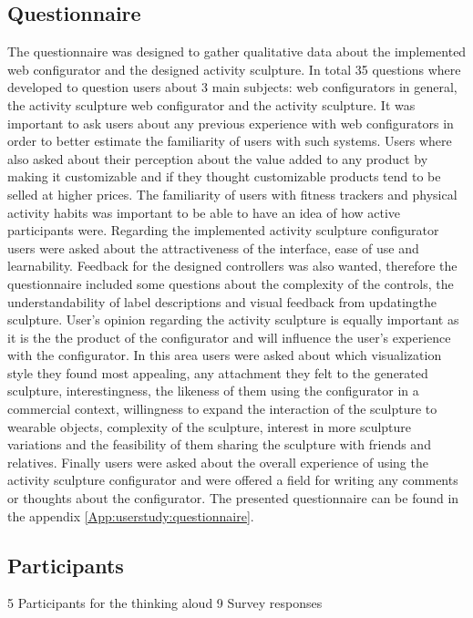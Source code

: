 \documentclass[../medieninformatik-arbeit.tex]{subfiles}
\begin{document}
\subsection{Questionnaire}
The questionnaire was designed to gather qualitative data about the implemented web configurator and the designed activity sculpture. In total 35 questions where developed to question users about 3 main subjects: web configurators in general, the activity sculpture web configurator and the activity sculpture. It was important to ask users about any previous experience with web configurators in order to better estimate the familiarity of users with such systems. Users where also asked about their perception about the value added to any product by making it customizable and if they thought customizable products tend to be selled at higher prices. The familiarity of users with fitness trackers and physical activity habits was important to be able to have an idea of how active participants were. Regarding the implemented activity sculpture configurator users were asked about the attractiveness of the interface, ease of use and learnability. Feedback for the designed controllers was also wanted, therefore the questionnaire included some questions about the complexity of the controls, the understandability of label descriptions and visual feedback from updatingthe sculpture. User's opinion regarding the activity sculpture is equally important as it is the the product of the configurator and will influence the user's experience with the configurator. In this area users were asked about which visualization style they found most appealing, any attachment they felt to the generated sculpture, interestingness, the likeness of them using the configurator in a commercial context, willingness to expand the interaction of the sculpture to wearable objects, complexity of the sculpture, interest in more sculpture variations  and the feasibility of them sharing the sculpture with friends and relatives.
Finally users were asked about the overall experience of using the activity sculpture configurator and were offered a field for writing any comments or thoughts about the configurator. 
The presented questionnaire can be found in the appendix \ref{App:userstudy:questionnaire}.


\subsection{Participants}
5 Participants for the thinking aloud
9 Survey responses
\end{document}

